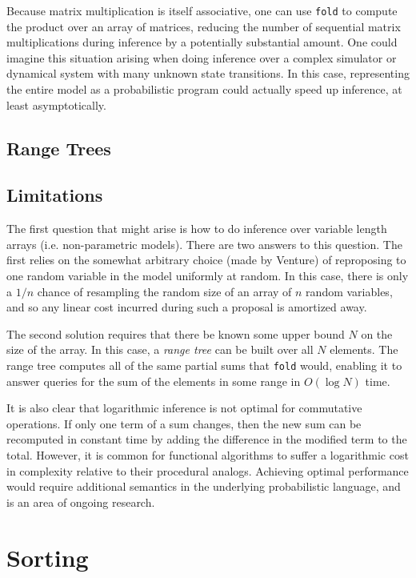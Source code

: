 \documentclass[11pt]{article}
\begin{document}
Because matrix multiplication is itself associative, one can use \texttt{fold} to compute the product over an array of matrices, reducing the number of sequential matrix multiplications during inference by a potentially substantial amount. One could imagine this situation arising when doing inference over a complex simulator or dynamical system with many unknown state transitions. In this case, representing the entire model as a probabilistic program could actually speed up inference, at least asymptotically.

\subsection{Range Trees}



\subsection{Limitations}

The first question that might arise is how to do inference over variable length arrays (i.e. non-parametric models). There are two answers to this question. The first relies on the  somewhat arbitrary choice (made by Venture) of reproposing to one random variable in the model uniformly at random. In this case, there is only a $1/n$ chance of resampling the random size of an array of $n$ random variables, and so any linear cost incurred during such a proposal is amortized away.

The second solution requires that there be known some upper bound $N$ on the size of the array. In this case, a \emph{range tree} can be built over all $N$ elements. The range tree computes all of the same partial sums that \texttt{fold} would, enabling it to answer queries for the sum of the elements in some range in $O(\log N)$ time. 

It is also clear that logarithmic inference is not optimal for commutative operations. If only one term of a sum changes, then the new sum can be recomputed in constant time by adding the difference in the modified term to the total. However, it is common for functional algorithms to suffer a logarithmic cost in complexity relative to their procedural analogs. Achieving optimal performance would require additional semantics in the underlying probabilistic language, and is an area of ongoing research.

\section{Sorting}
\end{document}
